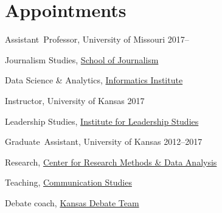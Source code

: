 \section{\vspace{1.2em}Appointments}

Assistant~Professor, University of Missouri \hfill 2017--

  \begin{outerlist}
    \item[] Journalism Studies, \href{http://journalism.missouri.edu}{School of Journalism}
    \item[] Data Science \& Analytics, \href{https://muii.missouri.edu/}{Informatics Institute}
  \end{outerlist}\vspace{.2in}

Instructor, University of Kansas \hfill 2017

  \begin{outerlist}
    \item[] Leadership Studies, \href{https://ils.ku.edu/about}{Institute for Leadership Studies}
  \end{outerlist}\vspace{.2in}

Graduate~Assistant, University of Kansas \hfill 2012--2017

  \begin{outerlist}
    \item[] Research, \href{http://www.crmda.ku.edu/}{Center for Research Methods \& Data Analysis}
    \item[] Teaching, \href{http://www.coms.ku.edu/}{Communication Studies}
    \item[] Debate coach, \href{http://www.debate.ku.edu/}{Kansas Debate Team}
  \end{outerlist}
